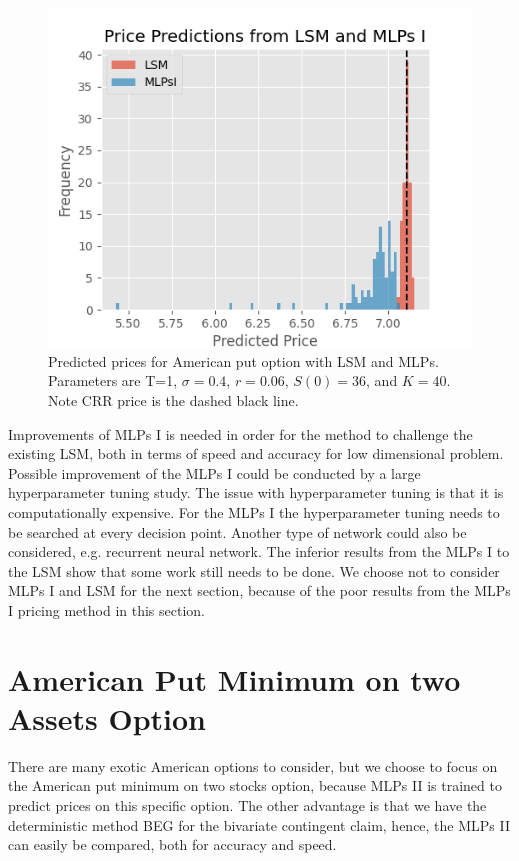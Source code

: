 \begin{figure}[H]
\centering
\includegraphics{Figures/histLSMMLPsI.png}
\decoRule
\caption[Histogram Price Predictions]{Predicted prices for American put option with LSM and MLPs. Parameters are T=1, $\sigma=0.4$, $r=0.06$, $S(0)=36$, and $K=40$. Note CRR price is the dashed black line.}
\label{fig:histLSMMLPsI}
\end{figure}

Improvements of MLPs I is needed in order for the method to challenge the existing LSM, both in terms of speed and accuracy for low dimensional problem. Possible improvement of the MLPs I could be conducted by a large hyperparameter tuning study. The issue with hyperparameter tuning is that it is computationally expensive. For the MLPs I the hyperparameter tuning needs to be searched at every decision point. Another type of network could also be considered, e.g. recurrent neural network. The inferior results from the MLPs I to the LSM show that some work still needs to be done. We choose not to consider MLPs I and LSM for the next section, because of the poor results from the MLPs I pricing method in this section.\\
\section{American Put Minimum on two Assets Option}\label{bivariateAmerPut}
There are many exotic American options to consider, but we choose to focus on the American put minimum on two stocks option, because MLPs II is trained to predict prices on this specific option. The other advantage is that we have the deterministic method BEG for the bivariate contingent claim, hence, the MLPs II can easily be compared, both for accuracy and speed.\\

